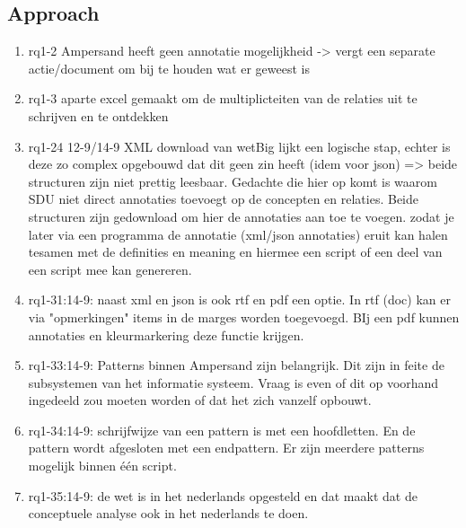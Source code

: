 \subsection{Approach}
\begin{comment}
plaats hier de afgehandelde items.
\end{comment}
\begin{enumerate}
    \item rq1-2 Ampersand heeft geen annotatie mogelijkheid -> vergt een separate actie/document om bij te houden wat er geweest is
    \item rq1-3 aparte excel gemaakt om de multiplicteiten van de relaties uit te schrijven en te ontdekken
    \item rq1-24 12-9/14-9 XML download van wetBig lijkt een logische stap, echter is deze zo complex opgebouwd dat dit geen zin heeft (idem voor json) => beide structuren zijn niet prettig leesbaar. Gedachte die hier op komt is waarom SDU niet direct annotaties toevoegt op de concepten en relaties. Beide structuren zijn gedownload om hier de annotaties aan toe te voegen. zodat je later via een programma de annotatie (xml/json annotaties) eruit kan halen tesamen met de definities en meaning en hiermee een script of een deel van een script mee kan genereren.
    \item rq1-31:14-9: naast xml en json is ook rtf en pdf een optie. In rtf (doc) kan er via "opmerkingen" items in de marges worden toegevoegd. BIj een pdf kunnen annotaties en kleurmarkering deze functie krijgen.
    \item rq1-33:14-9: Patterns binnen Ampersand zijn belangrijk. Dit zijn in feite de subsystemen van het informatie systeem. Vraag is even of dit op voorhand ingedeeld zou moeten worden of dat het zich vanzelf opbouwt.
    \item rq1-34:14-9: schrijfwijze van een pattern is met een hoofdletten. En de pattern wordt afgesloten met een endpattern. Er zijn meerdere patterns mogelijk binnen één script.
    \item rq1-35:14-9: de wet is in het nederlands opgesteld en dat maakt dat de conceptuele analyse ook in het nederlands te doen.
\end{enumerate}

